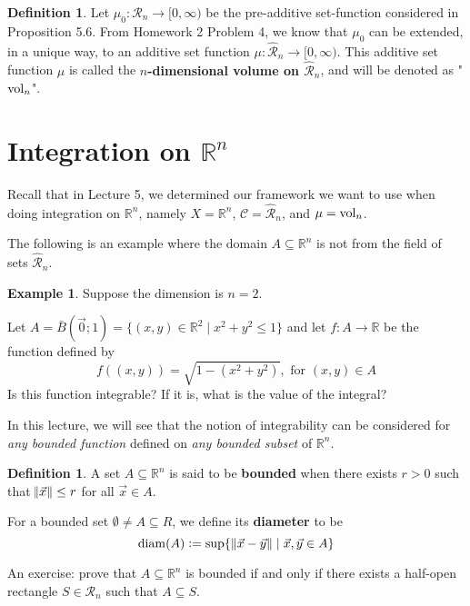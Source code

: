 \documentclass[11pt]{article}
\theoremstyle{definition}
\newtheorem{defn}[thm]{Definition}
\newtheorem{exmp}[thm]{Example}
\newcommand{\R}{\ensuremath{\mathbb{R}}}
\begin{document}
\begin{defn} 
Let $\mu_0 : \mathcal{R}_n \to [0, \infty)$ be the pre-additive set-function considered in Proposition 5.6. From Homework 2 Problem 4, we know that $\mu_0$ can be extended, in a unique way, to an additive set function $\mu : \widehat{\mathcal{R}}_n \to [0, \infty)$. This additive set function $\mu$ is called the {\bf $n$-dimensional volume on $\widehat{\mathcal{R}}_n$}, and will be denoted as "${\rm vol}_n$". 
\end{defn}

\newpage
\section{Integration on $\R^n$}

Recall that in Lecture 5, we determined our framework we want to use when doing integration on $\R^n$, namely $X = \R^n$, $\mathcal{C} = \widehat{\mathcal{R}}_n$, and $\mu = {\rm vol}_n$.

The following is an example where the domain $A \subseteq \R^n$ is not from the field of sets $\widehat{\mathcal{R}}_n$. 
\begin{exmp}
Suppose the dimension is $n = 2$.

Let $A = \bar{B}(\vec{0}; 1) = \{(x, y) \in \R^2 \mid x^2 + y^2 \leq 1\}$ and let $f : A \to \R$ be the function defined by 
$$f \left( (x, y) \right) = \sqrt{1 - (x^2 + y^2)}, \text{ for } (x, y) \in A$$
Is this function integrable? If it is, what is the value of the integral?

In this lecture, we will see that the notion of integrability can be considered for {\it any bounded function} defined on {\it any bounded subset} of $\R^n$.
\end{exmp}

\begin{defn}
A set $A \subseteq \R^n$ is said to be {\bf bounded} when there exists $r > 0$ such that $\norm{\vec{x}} \leq r$ for all $\vec{x} \in A$.

For a bounded set $\emptyset \ne A \subseteq R$, we define its {\bf diameter} to be
$${\rm diam}(A) := \sup\{\,\norm{\vec{x} - \vec{y}} \mid \vec{x}, \vec{y} \in A\}$$

An exercise: prove that $A \subseteq \R^n$ is bounded if and only if there exists a half-open rectangle $S \in \mathcal{R}_n$ such that $A \subseteq S$. 
\end{defn}
\end{document}
